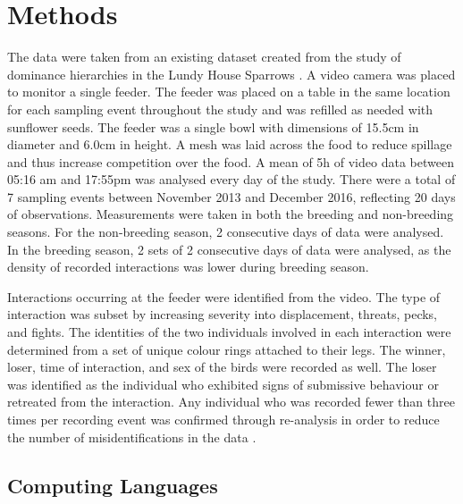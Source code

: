 \documentclass[11pt]{article}
\begin{document}
\section{Methods}
\par The data were taken from an existing dataset created from the study of dominance hierarchies in the Lundy House Sparrows \citep{SANCHEZ18}.  A video camera was placed to monitor a single feeder.  The feeder was placed on a table in the same location for each sampling event throughout the study and was refilled as needed with sunflower seeds.  The feeder was a single bowl with dimensions of 15.5cm in diameter and 6.0cm in height.  A mesh was laid across the food to reduce spillage and thus increase competition over the food.   A mean of 5h of video data between 05:16 am and 17:55pm was analysed every day of the study.  There were a total of 7 sampling events between November 2013 and December 2016, reflecting 20 days of observations.  Measurements were taken in both the breeding and non-breeding seasons.  For the non-breeding season, 2 consecutive days of data were analysed.  In the breeding season, 2 sets of 2 consecutive days of data were analysed, as the density of recorded interactions was lower during breeding season.  
\par  Interactions occurring at the feeder were identified from the video.  The type of interaction was subset by increasing severity into displacement, threats, pecks, and fights.  The identities of the two individuals involved in each interaction were determined from a set of unique colour rings attached to their legs.  The winner, loser, time of interaction, and sex of the birds were recorded as well.  The loser was identified as the individual who exhibited signs of submissive behaviour or retreated from the interaction.  Any individual who was recorded fewer than three times per recording event was confirmed through re-analysis in order to reduce the number of misidentifications in the data \citep{SANCHEZ18}.  

\subsection{Computing Languages}
	
\end{document}
